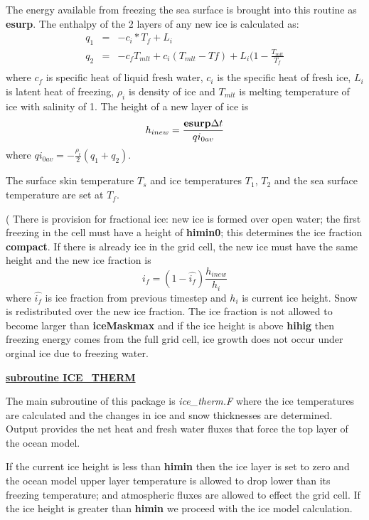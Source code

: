 \noindent
The energy available from freezing
the sea surface is brought into this routine as {\bf esurp}.
The enthalpy of the 2 layers of any new ice is calculated as:
\begin{eqnarray}
q_1 & = & -c_{i}*T_f + L_i \nonumber \\
q_2 & = & -c_{f}T_{mlt}+ c_{i}(T_{mlt}-T{f}) + L_i(1-\frac{T_{mlt}}{T_f} 
\nonumber \\
\end{eqnarray}
where  $c_f$ is specific heat of liquid fresh water, $c_i$ is the
specific heat of fresh ice, $L_i$ is latent heat of freezing, 
$\rho_i$ is density of ice and
$T_{mlt}$ is melting temperature of ice with salinity of 1.
The height of a new layer of ice is
\[
  h_{i new} = \frac{{\bf esurp} \Delta t}{qi_{0av}}
\]
where $qi_{0av}=-\frac{\rho_i}{2} (q_1+q_2)$.

The surface skin temperature $T_s$ and ice temperatures
$T_1$, $T_2$ and the sea surface temperature are set at $T_f$.

\noindent
{\tiny ( There is provision for fractional ice:
new ice is formed over open water; the first freezing in the cell
must have a height of {\bf himin0}; this determines the ice
fraction {\bf compact}. If there is already ice in the grid cell,
the new ice must have the same height and the new ice fraction
is 
\[
i_f=(1-\hat{i_f}) \frac{h_{i new}}{h_i}
\]
where $\hat{i_f}$ is ice fraction from previous timestep
and $h_i$ is current ice height. Snow is redistributed 
over the new ice fraction. The ice fraction is
not allowed to become larger than {\bf iceMaskmax} and
if the ice height is above {\bf hihig} then freezing energy
comes from the full grid cell,  ice growth does not occur
under orginal ice due to freezing water.
}

\vspace{1cm}
\noindent
{\bf {\underline{subroutine ICE\_THERM}}}

\noindent
The main subroutine of this package is {\it ice\_therm.F} where the
ice temperatures are calculated and the changes in ice and snow
thicknesses are determined. Output provides the net heat and fresh 
water fluxes that force the top layer of the ocean model.

If the current ice height is less than {\bf himin} then
the ice layer is set to zero and the ocean model upper layer temperature
is allowed to drop lower than its freezing temperature; and atmospheric
fluxes are allowed to effect the grid cell.
If the ice height is greater than  {\bf himin} we proceed with
the ice model calculation.

